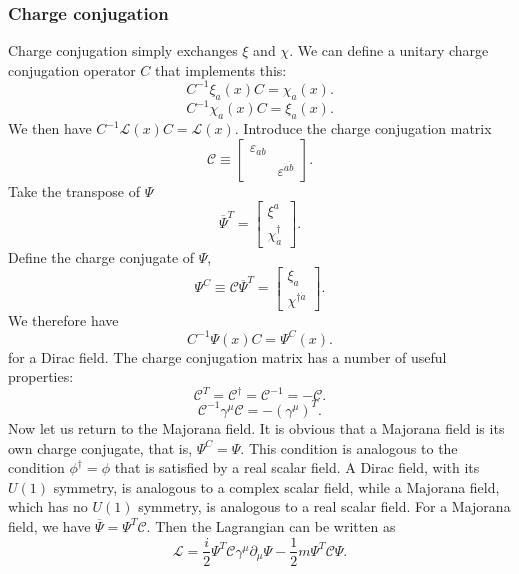 \subsubsection{Charge conjugation}
\noindent
Charge conjugation simply exchanges $\xi$ and $\chi$. We can define a unitary charge conjugation operator $C$ that implements this:
\[C^{-1}\xi_a(x)C = \chi_a(x).\]
\[C^{-1}\chi_a(x)C = \xi_a(x).\]
We then have $C^{-1}\mathcal{L}(x)C = \mathcal{L}(x)$.
Introduce the charge conjugation matrix
\[\mathcal{C} \equiv \left[ \begin{matrix} \varepsilon_{ab}& \\ & \varepsilon ^{\dot{a}\dot{b}}\end{matrix} \right].\]
Take the transpose of $\Psi$
\[\overline{\Psi}^T = \left[ \begin{matrix} \xi^a\\ \chi_{\dot{a}}^{\dagger}\end{matrix} \right] .\]
Define the charge conjugate of $\Psi$,
\[\Psi^C \equiv \mathcal{C}\overline{\Psi}^T = \left[ \begin{matrix} \xi_a\\ \chi^{\dagger \dot{a}}\end{matrix} \right] .\]
We therefore have
\[C^{-1}\Psi(x)C = \Psi^C(x).\]
for a Dirac field.
The charge conjugation matrix has a number of useful properties:
\[\mathcal{C}^T = \mathcal{C}^{\dagger} = \mathcal{C}^{-1} = -\mathcal{C}.\]
\[\mathcal{C}^{-1} \gamma^{\mu} \mathcal{C} = - (\gamma^{\mu})^T.\]
Now let us return to the Majorana field. It is obvious that a Majorana field is its own charge conjugate, that is, $\Psi^C = \Psi$. This condition is analogous to the condition $\phi^{\dagger} = \phi$ that is satisfied by a real scalar field. A Dirac field, with its $U(1)$ symmetry, is analogous to a complex scalar field, while a Majorana field, which has no $U(1)$ symmetry, is analogous to a real scalar field.
For a Majorana field, we have $\overline{\Psi} = \Psi^T \mathcal{C}$. Then the Lagrangian can be written as
\[\mathcal{L} = \frac{i}{2} \Psi^T \mathcal{C} \gamma^{\mu} \partial_{\mu} \Psi - \frac{1}{2}m \Psi^T \mathcal{C} \Psi.\]

